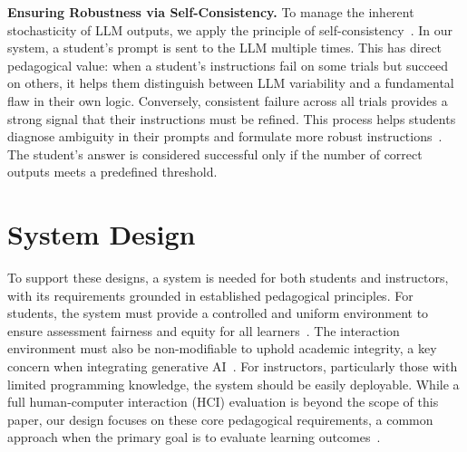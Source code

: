 \documentclass{article} %
\begin{document}
\textbf{Ensuring Robustness via Self-Consistency.} To manage the inherent stochasticity of LLM outputs, we apply the principle of self-consistency~\citep{wang2022self}. In our system, a student's prompt is sent to the LLM multiple times. This has direct pedagogical value: when a student's instructions fail on some trials but succeed on others, it helps them distinguish between LLM variability and a fundamental flaw in their own logic. Conversely, consistent failure across all trials provides a strong signal that their instructions must be refined. This process helps students diagnose ambiguity in their prompts and formulate more robust instructions~\citep{10.5555/3666122.3668141}. The student's answer is considered successful only if the number of correct outputs meets a predefined threshold.


\section{System Design}
\label{sec:system_design}




To support these designs, a system is needed for both students and instructors, with its requirements grounded in established pedagogical principles. For students, the system must provide a controlled and uniform environment to ensure assessment fairness and equity for all learners~\citep{AERA2014Standards}. The interaction environment must also be non-modifiable to uphold academic integrity, a key concern when integrating generative AI~\citep{denny2024desirable}. For instructors, particularly those with limited programming knowledge, the system should be easily deployable. While a full human-computer interaction (HCI) evaluation is beyond the scope of this paper, our design focuses on these core pedagogical requirements, a common approach when the primary goal is to evaluate learning outcomes~\citep{Koedinger2013ITS}.
\end{document}
